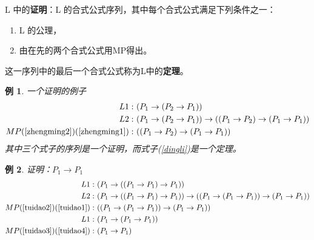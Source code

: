 \documentclass[12pt,onecolumn,a4paper]{book}
\newtheorem*{example}{例}
\numberwithin{table}{subsection}
\numberwithin{equation}{subsection}
\begin{document}
L 中的\textbf{证明}：L 的合式公式序列，其中每个合式公式满足下列条件之一：

\begin{enumerate}[itemsep=0pt,parsep=0pt]
    \item L 的公理，
    \item 由在先的两个合式公式用MP得出。
\end{enumerate}

这一序列中的最后一个合式公式称为L中的\textbf{定理}。

\begin{example}一个证明的例子
    \begin{align}
        L1: \ & (P_1 \rightarrow (P_2 \rightarrow P_1))\label{zhengming1} \\
        L2: \ & (P_1 \rightarrow (P_2 \rightarrow P_1))\rightarrow ((P_1 \rightarrow P_2)\rightarrow(P_1 \rightarrow P_1))\label{zhengming2} \\
        MP(\ref{zhengming2})(\ref{zhengming1}): \ & ((P_1 \rightarrow P_2)\rightarrow(P_1 \rightarrow P_1)) \label{dingli}
    \end{align}
    其中三个式子的序列是一个证明，而式子(\ref{dingli})是一个定理。
\end{example}

\begin{example}证明：$P_1 \rightarrow P_1$
    \begin{align}
        L1: \ & (P_1 \rightarrow ((P_1 \rightarrow P_1) \rightarrow P_1))\label{tuidao1} \\
        L2: \ & (P_1 \rightarrow ((P_1 \rightarrow P_1) \rightarrow P_1)) \rightarrow ((P_1 \rightarrow (P_1 \rightarrow P_1))\rightarrow(P_1 \rightarrow P_1))\label{tuidao2} \\
        MP(\ref{tuidao2})(\ref{tuidao1}): \ & ((P_1 \rightarrow (P_1 \rightarrow P_1))\rightarrow(P_1 \rightarrow P_1)) \label{tuidao3}\\
        L1: \ & (P_1 \rightarrow (P_1 \rightarrow P_1))\label{tuidao4} \\
        MP(\ref{tuidao3})(\ref{tuidao4}): \ & (P_1 \rightarrow P_1)
    \end{align}
\end{example}
\end{document}
